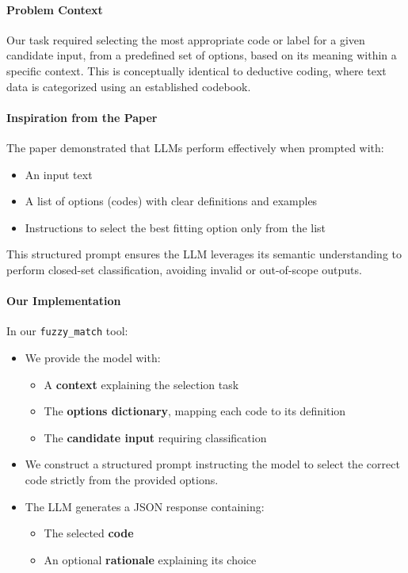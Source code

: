\documentclass{article}
\begin{document}
\paragraph{Problem Context}
Our task required selecting the most appropriate code or label for a given candidate input, from a predefined set of options, based on its meaning within a specific context. This is conceptually identical to deductive coding, where text data is categorized using an established codebook.

\paragraph{Inspiration from the Paper}
The paper demonstrated that LLMs perform effectively when prompted with:
\begin{itemize}
    \item An input text
    \item A list of options (codes) with clear definitions and examples
    \item Instructions to select the best fitting option only from the list
\end{itemize}
This structured prompt ensures the LLM leverages its semantic understanding to perform closed-set classification, avoiding invalid or out-of-scope outputs.

\paragraph{Our Implementation}
In our \texttt{fuzzy\_match} tool:
\begin{itemize}
    \item We provide the model with:
    \begin{itemize}
        \item A \textbf{context} explaining the selection task
        \item The \textbf{options dictionary}, mapping each code to its definition
        \item The \textbf{candidate input} requiring classification
    \end{itemize}
    \item We construct a structured prompt instructing the model to select the correct code strictly from the provided options.
    \item The LLM generates a JSON response containing:
    \begin{itemize}
        \item The selected \textbf{code}
        \item An optional \textbf{rationale} explaining its choice
    \end{itemize}
\end{itemize}
\end{document}
